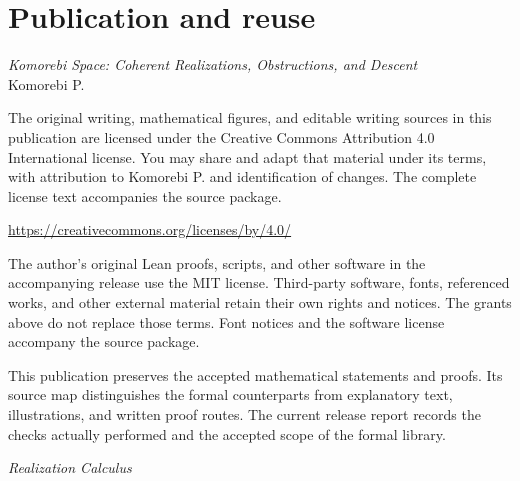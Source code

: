 \clearpage
\thispagestyle{empty}
\section*{Publication and reuse}
\noindent\emph{Komorebi Space: Coherent Realizations, Obstructions, and Descent}\\
Komorebi P.

The original writing, mathematical figures, and editable writing sources in this publication are licensed under the Creative Commons Attribution 4.0 International license. You may share and adapt that material under its terms, with attribution to Komorebi P. and identification of changes. The complete license text accompanies the source package.

\noindent\url{https://creativecommons.org/licenses/by/4.0/}

The author's original Lean proofs, scripts, and other software in the accompanying release use the MIT license. Third-party software, fonts, referenced works, and other external material retain their own rights and notices. The grants above do not replace those terms. Font notices and the software license accompany the source package.

This publication preserves the accepted mathematical statements and proofs. Its source map distinguishes the formal counterparts from explanatory text, illustrations, and written proof routes. The current release report records the checks actually performed and the accepted scope of the formal library.

\vfill
\noindent\textit{Realization Calculus}
\clearpage

